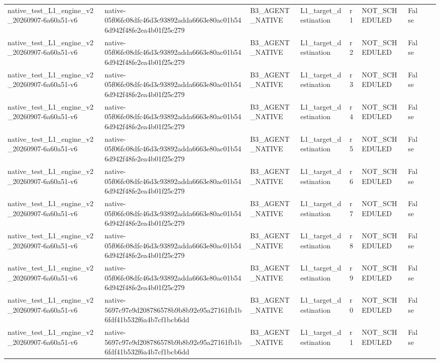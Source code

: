 \begin{tabular}{lllllllll}
native\_test\_L1\_engine\_v2\_20260907-6a60a51-v6 & native-05f06fc08dfc46d3c93892adda6663e80ac01b546d942f48fe2ea4b01f25c279 & B3\_AGENT\_NATIVE & L1\_target\_destination & r1 & NOT\_SCHEDULED & False &  &  \\
native\_test\_L1\_engine\_v2\_20260907-6a60a51-v6 & native-05f06fc08dfc46d3c93892adda6663e80ac01b546d942f48fe2ea4b01f25c279 & B3\_AGENT\_NATIVE & L1\_target\_destination & r2 & NOT\_SCHEDULED & False &  &  \\
native\_test\_L1\_engine\_v2\_20260907-6a60a51-v6 & native-05f06fc08dfc46d3c93892adda6663e80ac01b546d942f48fe2ea4b01f25c279 & B3\_AGENT\_NATIVE & L1\_target\_destination & r3 & NOT\_SCHEDULED & False &  &  \\
native\_test\_L1\_engine\_v2\_20260907-6a60a51-v6 & native-05f06fc08dfc46d3c93892adda6663e80ac01b546d942f48fe2ea4b01f25c279 & B3\_AGENT\_NATIVE & L1\_target\_destination & r4 & NOT\_SCHEDULED & False &  &  \\
native\_test\_L1\_engine\_v2\_20260907-6a60a51-v6 & native-05f06fc08dfc46d3c93892adda6663e80ac01b546d942f48fe2ea4b01f25c279 & B3\_AGENT\_NATIVE & L1\_target\_destination & r5 & NOT\_SCHEDULED & False &  &  \\
native\_test\_L1\_engine\_v2\_20260907-6a60a51-v6 & native-05f06fc08dfc46d3c93892adda6663e80ac01b546d942f48fe2ea4b01f25c279 & B3\_AGENT\_NATIVE & L1\_target\_destination & r6 & NOT\_SCHEDULED & False &  &  \\
native\_test\_L1\_engine\_v2\_20260907-6a60a51-v6 & native-05f06fc08dfc46d3c93892adda6663e80ac01b546d942f48fe2ea4b01f25c279 & B3\_AGENT\_NATIVE & L1\_target\_destination & r7 & NOT\_SCHEDULED & False &  &  \\
native\_test\_L1\_engine\_v2\_20260907-6a60a51-v6 & native-05f06fc08dfc46d3c93892adda6663e80ac01b546d942f48fe2ea4b01f25c279 & B3\_AGENT\_NATIVE & L1\_target\_destination & r8 & NOT\_SCHEDULED & False &  &  \\
native\_test\_L1\_engine\_v2\_20260907-6a60a51-v6 & native-05f06fc08dfc46d3c93892adda6663e80ac01b546d942f48fe2ea4b01f25c279 & B3\_AGENT\_NATIVE & L1\_target\_destination & r9 & NOT\_SCHEDULED & False &  &  \\
native\_test\_L1\_engine\_v2\_20260907-6a60a51-v6 & native-5697c97e9d208786578b9b8b92e95a27161fb1b6fdf41b532f6a4b7cf1bcb6dd & B3\_AGENT\_NATIVE & L1\_target\_destination & r0 & NOT\_SCHEDULED & False &  &  \\
native\_test\_L1\_engine\_v2\_20260907-6a60a51-v6 & native-5697c97e9d208786578b9b8b92e95a27161fb1b6fdf41b532f6a4b7cf1bcb6dd & B3\_AGENT\_NATIVE & L1\_target\_destination & r1 & NOT\_SCHEDULED & False &  &  \\

\end{tabular}
